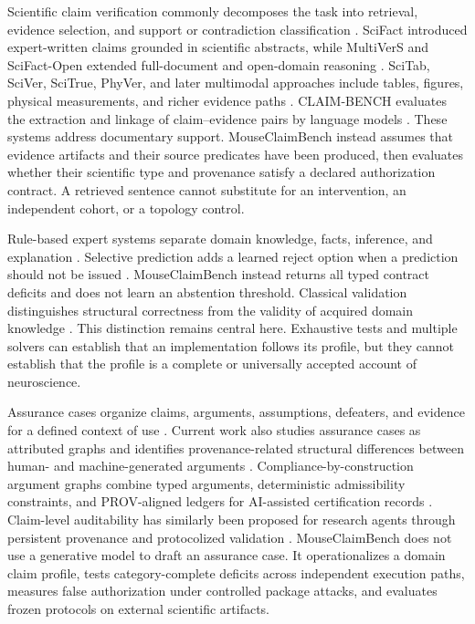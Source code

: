 Scientific claim verification commonly decomposes the task into retrieval, evidence selection, and support or contradiction classification \citep{vladika2023survey}. SciFact introduced expert-written claims grounded in scientific abstracts, while MultiVerS and SciFact-Open extended full-document and open-domain reasoning \citep{wadden2020scifact,wadden2022multivers,wadden2022scifactopen}. SciTab, SciVer, SciTrue, PhyVer, and later multimodal approaches include tables, figures, physical measurements, and richer evidence paths \citep{lu2023scitab,wang2025sciver,tan2026scitrue,chen2026phyver,zhang2026mever}. CLAIM-BENCH evaluates the extraction and linkage of claim--evidence pairs by language models \citep{javaji2025claimbench}. These systems address documentary support. MouseClaimBench instead assumes that evidence artifacts and their source predicates have been produced, then evaluates whether their scientific type and provenance satisfy a declared authorization contract. A retrieved sentence cannot substitute for an intervention, an independent cohort, or a topology control.

Rule-based expert systems separate domain knowledge, facts, inference, and explanation \citep{buchanan1984rulebased,studer1998knowledge}. Selective prediction adds a learned reject option when a prediction should not be issued \citep{geifman2019selectivenet}. MouseClaimBench instead returns all typed contract deficits and does not learn an abstention threshold. Classical validation distinguishes structural correctness from the validity of acquired domain knowledge \citep{benbasat1989validation,knauf2002validation}. This distinction remains central here. Exhaustive tests and multiple solvers can establish that an implementation follows its profile, but they cannot establish that the profile is a complete or universally accepted account of neuroscience.

Assurance cases organize claims, arguments, assumptions, defeaters, and evidence for a defined context of use \citep{batarseh2021assurance,mohamad2021assurance}. Current work also studies assurance cases as attributed graphs and identifies provenance-related structural differences between human- and machine-generated arguments \citep{ikhwantri2026assurancegraphs}. Compliance-by-construction argument graphs combine typed arguments, deterministic admissibility constraints, and PROV-aligned ledgers for AI-assisted certification records \citep{moghaddam2026compliance}. Claim-level auditability has similarly been proposed for research agents through persistent provenance and protocolized validation \citep{rasheed2026auditability}. MouseClaimBench does not use a generative model to draft an assurance case. It operationalizes a domain claim profile, tests category-complete deficits across independent execution paths, measures false authorization under controlled package attacks, and evaluates frozen protocols on external scientific artifacts.

